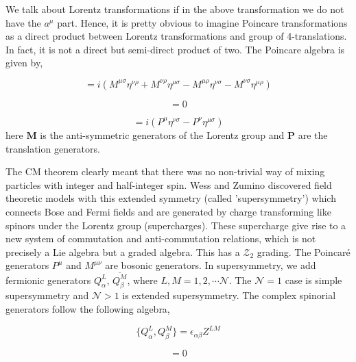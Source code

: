 We talk about Lorentz transformations if in the above transformation we do not have the $ a^{\mu}$ part. Hence, it is pretty obvious to
imagine Poincare transformations as a direct product between Lorentz transformations and group of 4-translations. 
In fact, it is not a direct but semi-direct product of two. 
The Poincare algebra is given by, 
 
 \begin{equation}
 [M^{\mu\nu} , M^{\rho\sigma}] = i \left (M^{\mu\sigma} \eta^{\nu\rho} + M^{\nu\rho} \eta^{\mu\sigma} - M^{\mu\rho} \eta^{\nu\sigma} - M^{\nu\sigma} \eta^{\mu\rho} \right)
 \end{equation}
 
 \begin{equation}
[P^{\mu}, P^{\nu}] = 0
 \end{equation}
 
\begin{equation}
[M^{\mu\nu}, P^{\sigma}] = i \left(P^{\mu}\eta^{\nu\sigma} - P^{\nu}\eta^{\mu\sigma}\right)
\end{equation}
here $\textbf{M}$ is the anti-symmetric generators of the Lorentz group and $ \textbf{P}$ are the translation generators. 

The CM theorem clearly meant that there was no non-trivial way of mixing particles with integer and half-integer spin. 
Wess and Zumino discovered field theoretic models with this extended symmetry (called 'supersymmetry') 
which connects Bose and Fermi fields and are generated by charge transforming like spinors under the 
Lorentz group (supercharges). These supercharge give rise to a new system of commutation and anti-commutation relations, 
which is not precisely a Lie algebra but a graded algebra. This has a $ \mathcal{Z}_{2}$ grading. 
The Poincar\'{e} generators $ P^\mu$ and $M^{\mu\nu}$ are bosonic generators. In supersymmetry, we add fermionic generators $Q_{\alpha}^{L}$, $\overline{Q_{\beta}^{M}}$, where
$L, M = 1,2, \cdots \mathcal{N}$. The $\mathcal{N} = 1 $ case is simple supersymmetry and $\mathcal{N}  > 1$ is extended supersymmetry. 
The complex spinorial generators follow the following algebra, 

\begin{equation} 
\{Q_{\alpha}^{L}, Q_{\beta}^{M}\} = \epsilon_{\alpha\beta} Z^{LM}
\end{equation} 

\begin{equation} 
 [P,Q] = 0
 \end{equation} 

